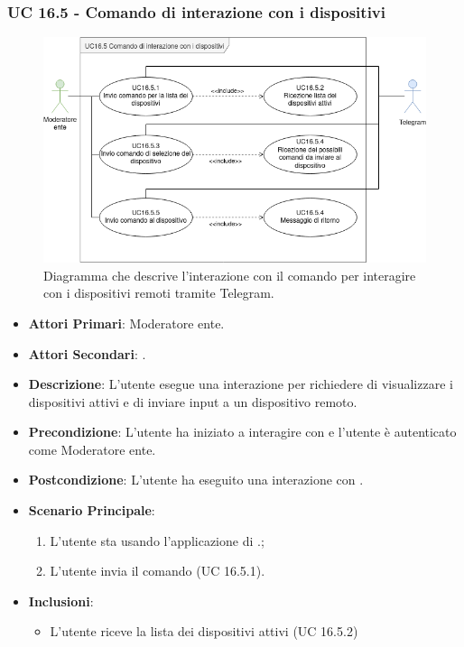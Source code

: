 	\subsubsection{UC 16.5 - Comando di interazione con i dispositivi}

	\begin{figure}[H]
		\centering
		\includegraphics[scale=0.60]{res/images/uc16.5}
		\caption{Diagramma che descrive l'interazione con il comando per interagire con i dispositivi remoti tramite Telegram.}
	\end{figure}

	\begin{itemize}
		\item \textbf{Attori Primari}: Moderatore ente.
		\item \textbf{Attori Secondari}: .
		\item \textbf{Descrizione}: L'utente esegue una interazione per richiedere di visualizzare i dispositivi attivi e di inviare input a un dispositivo remoto. 
		\item \textbf{Precondizione}: L'utente ha iniziato a interagire con  e l'utente è autenticato come Moderatore ente.
		\item \textbf{Postcondizione}: L'utente ha eseguito una interazione con .
		\item \textbf{Scenario Principale}:
		\begin{enumerate}
			\item L'utente sta usando l'applicazione di .;
			\item L'utente invia il comando (UC 16.5.1).
		\end{enumerate}
		\item \textbf{Inclusioni}:
		\begin{itemize}
			\item L'utente riceve la lista dei dispositivi attivi (UC 16.5.2)
		\end{itemize}
	\end{itemize}


